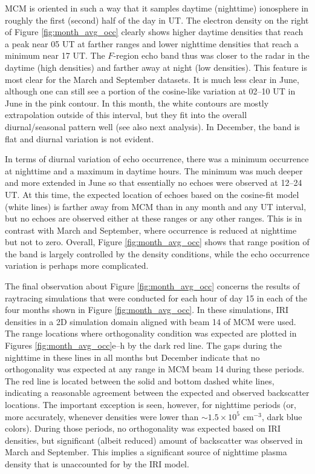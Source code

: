 MCM is oriented in such a way that it samples daytime (nighttime) ionosphere in roughly the first (second) half of the day in UT. The electron density on the right of Figure \ref{fig:month_avg_occ} clearly shows higher daytime densities that reach a peak near 05 UT at farther ranges and lower nighttime densities that reach a minimum near 17 UT. The \(F\)-region echo band thus was closer to the radar in the daytime (high densities) and farther away at night (low densities). This feature is most clear for the March and September datasets. It is much less clear in June, although one can still see a portion of the cosine-like variation at 02--10 UT in June in the pink contour. In this month, the white contours are mostly extrapolation outside of this interval, but they fit into the overall diurnal/seasonal pattern well (see also next analysis).  In December, the band is flat and diurnal variation is not evident.

In terms of diurnal variation of echo occurrence, there was a minimum occurrence at nighttime and a maximum in daytime hours. The minimum was much deeper and more extended in June so that essentially no echoes were observed at 12--24 UT. At this time, the expected location of echoes based on the cosine-fit model (white lines) is farther away from MCM than in any month and any UT interval, but no echoes are observed either at these ranges or any other ranges. This is in contrast with March and September, where occurrence is reduced at nighttime but not to zero. Overall, Figure \ref{fig:month_avg_occ} shows that range position of the band is largely controlled by the density conditions, while the echo occurrence variation is perhaps more complicated.

The final observation about Figure \ref{fig:month_avg_occ} concerns the results of raytracing simulations that were conducted for each hour of day 15 in each of the four months shown in Figure \ref{fig:month_avg_occ}. In these simulations, IRI densities in a 2D simulation domain aligned with beam 14 of MCM were used. The range locations where orthogonality condition was expected are plotted in Figures \ref{fig:month_avg_occ}e--h by the dark red line. The gaps during the nighttime in these lines in all months but December indicate that no orthogonality was expected at any range in MCM beam 14 during these periods. The red line is located between the solid and bottom dashed white lines, indicating a reasonable agreement between the expected and observed backscatter locations. The important exception is seen, however, for nighttime periods (or, more accurately, whenever densities were lower than \(\sim1.5\times10^5\) cm\(^{-3}\), dark blue colors). During those periods, no orthogonality was expected based on IRI densities, but significant (albeit reduced) amount of backscatter was observed in March and September. This implies a significant source of nighttime plasma density that is unaccounted for by the IRI model.



